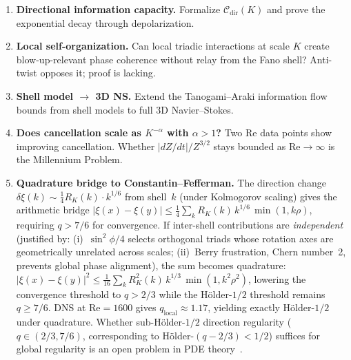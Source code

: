 \documentclass[11pt]{article}
\theoremstyle{definition}
\theoremstyle{remark}
\begin{document}
\begin{enumerate}
  \item \textbf{Directional information capacity.}
    Formalize $\mathcal{C}_{\mathrm{dir}}(K)$ and prove the
    exponential decay through depolarization.
  \item \textbf{Local self-organization.} Can local triadic
    interactions at scale $K$ create blow-up-relevant phase coherence
    without relay from the Fano shell? Anti-twist opposes it; proof
    is lacking.
  \item \textbf{Shell model $\to$ 3D NS.} Extend the Tanogami--Araki
    information flow bounds from shell models to full 3D
    Navier--Stokes.
  \item \textbf{Does cancellation scale as $K^{-\alpha}$ with
    $\alpha > 1$?} Two Re data points show improving cancellation.
    Whether $|dZ/dt|/Z^{3/2}$ stays bounded as $\mathrm{Re} \to \infty$
    is the Millennium Problem.
  \item \textbf{Quadrature bridge to Constantin--Fefferman.}
    The direction change $\delta\xi(k) \sim \tfrac{1}{4} R_K(k)
    \cdot k^{1/6}$ from shell~$k$ (under Kolmogorov scaling) gives
    the arithmetic bridge
    $|\xi(x)-\xi(y)| \leq \tfrac{1}{4}\sum_k R_K(k)\, k^{1/6}\,
    \min(1, k\rho)$,
    requiring $q > 7/6$ for convergence.
    If inter-shell contributions are \emph{independent}
    (justified by: (i)~$\sin^2\phi/4$ selects orthogonal triads
    whose rotation axes are geometrically unrelated across scales;
    (ii)~Berry frustration, Chern number~2, prevents global phase
    alignment), the sum becomes quadrature:
    $|\xi(x)-\xi(y)|^2 \leq \tfrac{1}{16}\sum_k R_K^2(k)\, k^{1/3}\,
    \min(1, k^2\rho^2)$,
    lowering the convergence threshold to $q > 2/3$
    while the H\"older-$1/2$ threshold remains $q \geq 7/6$.
    DNS at $\mathrm{Re} = 1600$ gives $q_{\mathrm{local}} \approx 1.17$,
    yielding exactly H\"older-$1/2$ under quadrature.
    Whether sub-H\"older-$1/2$ direction regularity
    ($q \in (2/3, 7/6)$, corresponding to
    H\"older-$(q - 2/3) < 1/2$) suffices for global regularity
    is an open problem in PDE theory~\cite{BdV2019}.
\end{enumerate}
\end{document}
